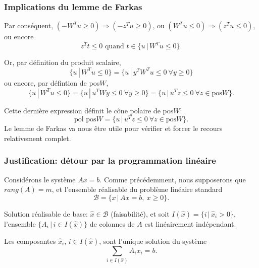 \begin{frame}
	\frametitle{Implications du lemme de Farkas}
	
	Par conséquent, $(-W^Tu \geq 0) \Rightarrow (-z^Tu \geq 0)$, ou 
	$(W^Tu \leq 0) \Rightarrow (z^Tu \leq 0)$,
	ou encore
	\[
	z^Tt \leq 0 \mbox{ quand } t \in \lbrace u \,|\, W^Tu \leq 0\rbrace.
	\]
	
	\mbox{}
	
	Or, par définition du produit scalaire, 
	\[
	\lbrace u \,|\, W^Tu \leq 0 \rbrace = \lbrace u \,|\, y^TW^Tu \leq 0\ \forall y \geq 0 \rbrace
	\]
	ou encore, par défintion de pos$W$,
	\[
	\lbrace u \,|\, W^Tu \leq 0 \rbrace
	= \lbrace u \,|\, u^TWy \leq 0\ \forall y \geq 0 \rbrace
	= \lbrace u \,|\, u^Tz \leq 0\ \forall z \in \mbox{pos} W \rbrace.
	\]
	
	Cette dernière expression définit le {\blue cône polaire} de pos$W$:
	\[
	\mbox{pol pos} W =
	\lbrace u \,|\, u^Tz \leq 0\ \forall z \in \mbox{pos} W \rbrace.
	\]
	Le lemme de Farkas va nous être utile pour vérifier et {\red forcer} le recours relativement
	complet.
	
\end{frame}

\begin{frame}
	\frametitle{Justification: détour par la programmation linéaire}
	
	Considérons le système $Ax = b$. Comme précédemment, nous supposerons
	que $rang(A) = m$, et l'ensemble réalisable du problème linéaire
	standard
	\[
	\mathcal{B} = \lbrace x \,|\, Ax=b,\ x \geq 0 \rbrace.
	\]
	
	\mbox{}
	
	{\red Solution réalisable de base}: $\hat{x} \in \mathcal{B}$
	(faisabilité), et soit $I(\hat{x}) = \lbrace i \,|\, \hat{x}_i > 0
	\rbrace$, l'ensemble $\lbrace A_i \,|\, i \in I(\hat{x}) \rbrace$ de
	colonnes de $A$ est linéairement indépendant.
	
	\mbox{}
	
	Les composantes $\hat{x}_i$, $i \in I(\hat{x})$, sont l'unique
	solution du système
	\[
	\sum_{i \in I(\hat{x})} A_ix_i = b.
	\]
	
\end{frame}



